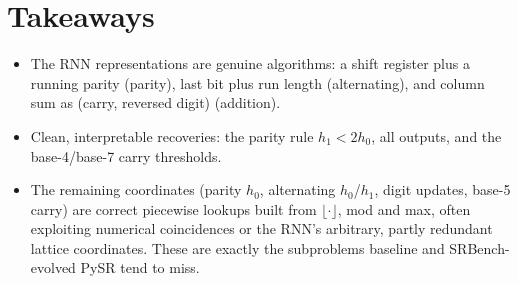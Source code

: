 \documentclass[10pt]{article}
\begin{document}
\section*{Takeaways}
\begin{itemize}
\item The RNN representations are genuine algorithms: a shift register plus a running parity
(parity), last bit plus run length (alternating), and column sum as (carry, reversed digit)
(addition).
\item Clean, interpretable recoveries: the parity rule $h_1<2h_0$, all outputs, and the
base-4/base-7 carry thresholds.
\item The remaining coordinates (parity $h_0$, alternating $h_0$/$h_1$, digit updates, base-5
carry) are correct piecewise lookups built from $\lfloor\cdot\rfloor$, mod and max, often exploiting
numerical coincidences or the RNN's arbitrary, partly redundant lattice coordinates.
These are exactly the subproblems baseline and SRBench-evolved PySR tend to miss.
\end{itemize}
\end{document}
